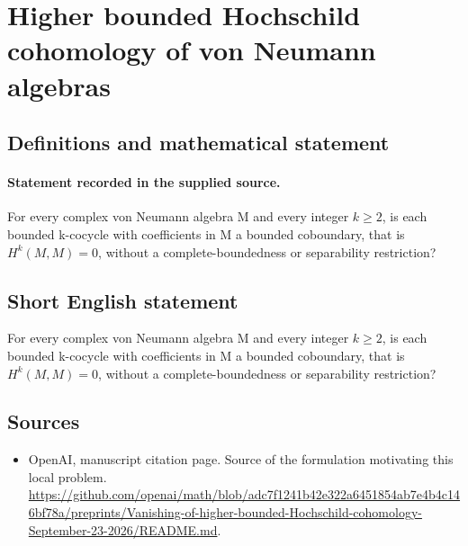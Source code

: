 \documentclass[11pt]{article}
\begin{document}
\section*{Higher bounded Hochschild cohomology of von Neumann algebras}\label{statement}
\subsection{Definitions and mathematical statement}
\paragraph{Statement recorded in the supplied source.}
For every complex von Neumann algebra M and every integer $k\geq 2$, is each bounded k-cocycle with coefficients in M a bounded coboundary, that is $H^k(M,M)=0$, without a complete-boundedness or separability restriction?
\subsection{Short English statement}
For every complex von Neumann algebra M and every integer $k\geq 2$, is each bounded k-cocycle with coefficients in M a bounded coboundary, that is $H^k(M,M)=0$, without a complete-boundedness or separability restriction?
\subsection{Sources}
\begin{itemize}
\item[S1] OpenAI, manuscript citation page. Source of the formulation motivating this local problem.
\url{https://github.com/openai/math/blob/adc7f1241b42e322a6451854ab7e4b4c146bf78a/preprints/Vanishing-of-higher-bounded-Hochschild-cohomology-September-23-2026/README.md}.
\end{itemize}
\end{document}
